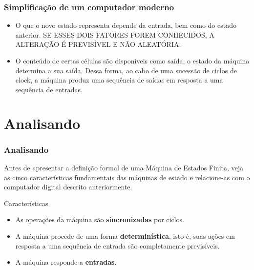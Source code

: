 \documentclass{beamer}
\begin{document}
\begin{frame}
  \frametitle{Simplificação de um computador moderno}

  \begin{itemize}
    \item O que o novo estado representa depende da entrada, bem como do estado 
      anterior. SE ESSES DOIS FATORES FOREM CONHECIDOS, A ALTERAÇÃO É 
      PREVISÍVEL E NÃO ALEATÓRIA.
      \pause
    \item O conteúdo de certas células são disponíveis como saída, o estado da 
      máquina determina a sua saída. Dessa forma, ao cabo de uma sucessão de 
      ciclos de clock, a máquina produz uma sequência de saídas em resposta a 
      uma sequência de entradas.
  \end{itemize}
\end{frame}

\section{Analisando}

\begin{frame}
  \frametitle{Analisando}

	Antes de apresentar a definição formal de uma Máquina de Estados Finita, veja 
  as cinco características fundamentais das máquinas de estado e relacione-as 
  com o computador digital descrito anteriormente.
  \pause
	
  \begin{block}{Características}
    \begin{itemize}
      \item As operações da máquina são \textbf{sincronizadas} por ciclos.
      \item A máquina procede de uma forma \textbf{determinística}, isto é, suas 
        ações em resposta a uma sequência de entrada são completamente 
        previsíveis.
      \item A máquina responde a \textbf{entradas}.
    \end{itemize}
  \end{block}
\end{frame}
\end{document}
